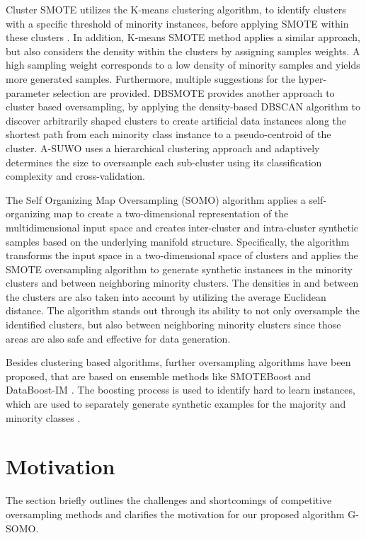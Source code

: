 \documentclass[parskip=full]{scrartcl}
\begin{document}
Cluster SMOTE utilizes the K-means clustering algorithm, to identify clusters with a specific threshold of minority instances, before applying SMOTE within these clusters \cite{Cieslak2006}. In addition, K-means SMOTE method \cite{Douzas2018} applies a similar approach, but also considers the density within the clusters by assigning samples weights. A high sampling weight corresponds to a low density of minority samples and yields more generated samples. Furthermore, multiple suggestions for the hyper-parameter selection are provided. DBSMOTE \cite{Bunkhumpornpat2012} provides another approach to cluster based oversampling, by applying the density-based DBSCAN algorithm to discover arbitrarily shaped clusters to create artificial data instances along the shortest path from each minority class instance to a pseudo-centroid of the cluster. A-SUWO \cite{Nekooeimehr2016} uses a hierarchical clustering approach and adaptively determines the size to oversample each sub-cluster using its classification complexity and cross-validation.

The Self Organizing Map Oversampling (SOMO) algorithm applies a self-organizing map to create a two-dimensional representation of the multidimensional input space and creates inter-cluster and intra-cluster synthetic samples based on the underlying manifold structure. Specifically, the algorithm transforms the input space in a two-dimensional space of clusters and applies the SMOTE oversampling algorithm to generate synthetic instances in the minority clusters and between neighboring minority clusters. The densities in and between the clusters are also taken into account by utilizing the average Euclidean distance. The algorithm stands out through its ability to not only oversample the identified clusters, but also between neighboring minority clusters since those areas are also safe and effective for data generation.

Besides clustering based algorithms, further oversampling algorithms have been proposed, that are based on ensemble methods like SMOTEBoost \cite{Chawla2003} and DataBoost-IM \cite{Guo2004}. The boosting process is used to identify hard to learn instances, which are used to separately generate synthetic examples for the majority and minority classes  \cite{Guo2004}.

\section{Motivation}

The section briefly outlines the challenges and shortcomings of competitive
oversampling methods and clarifies the motivation for our proposed algorithm
G-SOMO.
\end{document}
